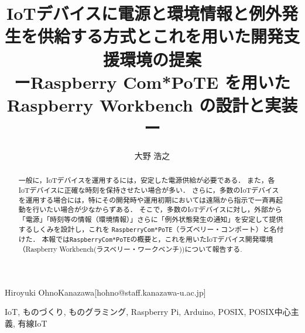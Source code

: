 \title{
  IoTデバイスに電源と環境情報と例外発生を供給する方式とこれを用いた開発支援環境の提案\\
  ーRaspberry Com*PoTE を用いた Raspberry Workbench の設計と実装ー
}



\author{大野 浩之}{Hiroyuki Ohno}{Kanazawa}[hohno@staff.kanazawa-u.ac.jp]


\begin{abstract}
 一般に，IoTデバイスを運用するには，安定した電源供給が必要である．
 また，各IoTデバイスに正確な時刻を保持させたい場合が多い．
 さらに，多数のIoTデバイスを運用する場合には，特にその開発時や運用初期においては遠隔から指示で一斉再起動を行いたい場合が少なからずある．
 そこで，多数のIoTデバイスに対し，外部から「電源」「時刻等の情報（環境情報）」さらに「例外状態発生の通知」を安定して提供するしくみを設計し，これを {\tt Raspberry\-Com*PoTE}（ラズベリー・コンポート）と名付けた．
 本報では{\tt Raspberry\-Com*PoTE}の概要と，これを用いたIoTデバイス開発環境（Raspberry Workbench(ラスベリー・ワークベンチ))について報告する.


\end{abstract}

\begin{jkeyword}
IoT, ものづくり, ものグラミング, Raspberry Pi, Arduino, POSIX, POSIX中心主義, 有線IoT
\end{jkeyword}


